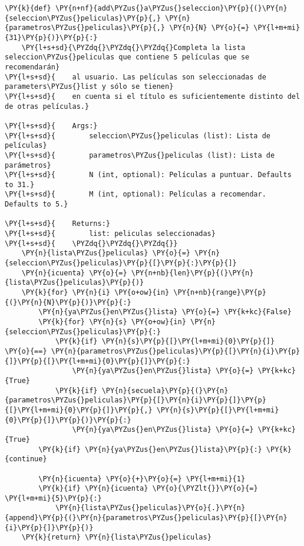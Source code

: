     \begin{tcolorbox}[breakable, size=fbox, boxrule=1pt, pad at break*=1mm,colback=cellbackground, colframe=cellborder]
\begin{Verbatim}[commandchars=\\\{\}]
\PY{k}{def} \PY{n+nf}{add\PYZus{}a\PYZus{}seleccion}\PY{p}{(}\PY{n}{seleccion\PYZus{}peliculas}\PY{p}{,} \PY{n}{parametros\PYZus{}peliculas}\PY{p}{,} \PY{n}{N} \PY{o}{=} \PY{l+m+mi}{31}\PY{p}{)}\PY{p}{:}
    \PY{l+s+sd}{\PYZdq{}\PYZdq{}\PYZdq{}Completa la lista seleccion\PYZus{}peliculas que contiene 5 películas que se recomendarán}
\PY{l+s+sd}{    al usuario. Las películas son seleccionadas de parameters\PYZus{}list y sólo se tienen}
\PY{l+s+sd}{    en cuenta si el título es suficientemente distinto del de otras películas.}

\PY{l+s+sd}{    Args:}
\PY{l+s+sd}{        seleccion\PYZus{}peliculas (list): Lista de películas}
\PY{l+s+sd}{        parametros\PYZus{}peliculas (list): Lista de parámetros}
\PY{l+s+sd}{        N (int, optional): Películas a puntuar. Defaults to 31.}
\PY{l+s+sd}{        M (int, optional): Películas a recomendar. Defaults to 5.}

\PY{l+s+sd}{    Returns:}
\PY{l+s+sd}{        list: peliculas seleccionadas}
\PY{l+s+sd}{    \PYZdq{}\PYZdq{}\PYZdq{}}
    \PY{n}{lista\PYZus{}peliculas} \PY{o}{=} \PY{n}{seleccion\PYZus{}peliculas}\PY{p}{[}\PY{p}{:}\PY{p}{]}
    \PY{n}{icuenta} \PY{o}{=} \PY{n+nb}{len}\PY{p}{(}\PY{n}{lista\PYZus{}peliculas}\PY{p}{)}    
    \PY{k}{for} \PY{n}{i} \PY{o+ow}{in} \PY{n+nb}{range}\PY{p}{(}\PY{n}{N}\PY{p}{)}\PY{p}{:}
        \PY{n}{ya\PYZus{}en\PYZus{}lista} \PY{o}{=} \PY{k+kc}{False}
        \PY{k}{for} \PY{n}{s} \PY{o+ow}{in} \PY{n}{seleccion\PYZus{}peliculas}\PY{p}{:}
            \PY{k}{if} \PY{n}{s}\PY{p}{[}\PY{l+m+mi}{0}\PY{p}{]} \PY{o}{==} \PY{n}{parametros\PYZus{}peliculas}\PY{p}{[}\PY{n}{i}\PY{p}{]}\PY{p}{[}\PY{l+m+mi}{0}\PY{p}{]}\PY{p}{:} 
                \PY{n}{ya\PYZus{}en\PYZus{}lista} \PY{o}{=} \PY{k+kc}{True}
            \PY{k}{if} \PY{n}{secuela}\PY{p}{(}\PY{n}{parametros\PYZus{}peliculas}\PY{p}{[}\PY{n}{i}\PY{p}{]}\PY{p}{[}\PY{l+m+mi}{0}\PY{p}{]}\PY{p}{,} \PY{n}{s}\PY{p}{[}\PY{l+m+mi}{0}\PY{p}{]}\PY{p}{)}\PY{p}{:} 
                \PY{n}{ya\PYZus{}en\PYZus{}lista} \PY{o}{=} \PY{k+kc}{True}            
        \PY{k}{if} \PY{n}{ya\PYZus{}en\PYZus{}lista}\PY{p}{:} \PY{k}{continue}
            
        \PY{n}{icuenta} \PY{o}{+}\PY{o}{=} \PY{l+m+mi}{1}
        \PY{k}{if} \PY{n}{icuenta} \PY{o}{\PYZlt{}}\PY{o}{=} \PY{l+m+mi}{5}\PY{p}{:}
            \PY{n}{lista\PYZus{}peliculas}\PY{o}{.}\PY{n}{append}\PY{p}{(}\PY{n}{parametros\PYZus{}peliculas}\PY{p}{[}\PY{n}{i}\PY{p}{]}\PY{p}{)}
    \PY{k}{return} \PY{n}{lista\PYZus{}peliculas}
\end{Verbatim}
\end{tcolorbox}

